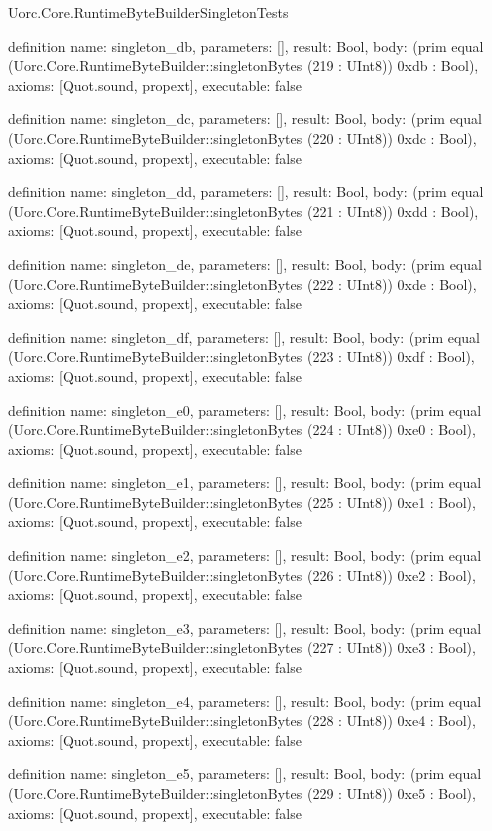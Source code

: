 \begin{lexlean}{Uorc.Core.RuntimeByteBuilderSingletonTests}
\begin{semanticmodule}
definition{
  name: singleton_db,
  parameters: [],
  result: Bool,
  body: (prim equal (Uorc.Core.RuntimeByteBuilder::singletonBytes (219 : UInt8)) 0xdb : Bool),
  axioms: [Quot.sound, propext],
  executable: false
}

definition{
  name: singleton_dc,
  parameters: [],
  result: Bool,
  body: (prim equal (Uorc.Core.RuntimeByteBuilder::singletonBytes (220 : UInt8)) 0xdc : Bool),
  axioms: [Quot.sound, propext],
  executable: false
}

definition{
  name: singleton_dd,
  parameters: [],
  result: Bool,
  body: (prim equal (Uorc.Core.RuntimeByteBuilder::singletonBytes (221 : UInt8)) 0xdd : Bool),
  axioms: [Quot.sound, propext],
  executable: false
}

definition{
  name: singleton_de,
  parameters: [],
  result: Bool,
  body: (prim equal (Uorc.Core.RuntimeByteBuilder::singletonBytes (222 : UInt8)) 0xde : Bool),
  axioms: [Quot.sound, propext],
  executable: false
}

definition{
  name: singleton_df,
  parameters: [],
  result: Bool,
  body: (prim equal (Uorc.Core.RuntimeByteBuilder::singletonBytes (223 : UInt8)) 0xdf : Bool),
  axioms: [Quot.sound, propext],
  executable: false
}

definition{
  name: singleton_e0,
  parameters: [],
  result: Bool,
  body: (prim equal (Uorc.Core.RuntimeByteBuilder::singletonBytes (224 : UInt8)) 0xe0 : Bool),
  axioms: [Quot.sound, propext],
  executable: false
}

definition{
  name: singleton_e1,
  parameters: [],
  result: Bool,
  body: (prim equal (Uorc.Core.RuntimeByteBuilder::singletonBytes (225 : UInt8)) 0xe1 : Bool),
  axioms: [Quot.sound, propext],
  executable: false
}

definition{
  name: singleton_e2,
  parameters: [],
  result: Bool,
  body: (prim equal (Uorc.Core.RuntimeByteBuilder::singletonBytes (226 : UInt8)) 0xe2 : Bool),
  axioms: [Quot.sound, propext],
  executable: false
}

definition{
  name: singleton_e3,
  parameters: [],
  result: Bool,
  body: (prim equal (Uorc.Core.RuntimeByteBuilder::singletonBytes (227 : UInt8)) 0xe3 : Bool),
  axioms: [Quot.sound, propext],
  executable: false
}

definition{
  name: singleton_e4,
  parameters: [],
  result: Bool,
  body: (prim equal (Uorc.Core.RuntimeByteBuilder::singletonBytes (228 : UInt8)) 0xe4 : Bool),
  axioms: [Quot.sound, propext],
  executable: false
}

definition{
  name: singleton_e5,
  parameters: [],
  result: Bool,
  body: (prim equal (Uorc.Core.RuntimeByteBuilder::singletonBytes (229 : UInt8)) 0xe5 : Bool),
  axioms: [Quot.sound, propext],
  executable: false
}


\end{semanticmodule}
\end{lexlean}
